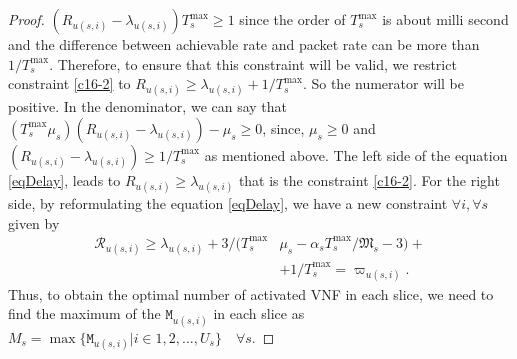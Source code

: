 \documentclass[lettersize,journal]{IEEEtran}
\begin{document}
\begin{proof}
$(R_{u(s,i)}-\lambda_{u(s,i)})T^{\max}_s \geq 1$ since the order of $T^{\max}_s$ is about milli second and the difference between achievable rate and packet rate can be more than $1/T^{\max}_s$.
Therefore, to ensure that this constraint will be valid, we restrict constraint \eqref{c16-2} to $R_{u(s,i)} \geq \lambda_{u(s,i)} + 1/T^{\max}_s$.
So the numerator will be positive.
In the denominator, we can say that $(T^{\max}_s\mu_s)(R_{u(s,i)}-\lambda_{u(s,i)}) - \mu_s \geq 0 $, since,
$\mu_s \geq 0$ and
$(R_{u(s,i)}-\lambda_{u(s,i)}) \geq 1/T^{\max}_s$ as mentioned above.
The left side of the equation \eqref{eqDelay}, leads to $R_{u(s,i)} \geq \lambda_{u(s,i)}$ that is the constraint \eqref{c16-2}.
For the right side, by reformulating the equation \eqref{eqDelay}, we have a new constraint $\forall i, \forall s$ given by
\begin{align}\label{RM}
\mathcal{R}_{u(s,i)} \geq \lambda_{u(s,i)}+ 3/(T^{\max}_s&\mu_s-\alpha_s T^{\max}_s/\mathfrak{M}_s-3)+\nonumber\\
&+ 1/T^{\max}_s=\varpi_{u(s,i)}.
\end{align}
Thus, to obtain the optimal number of activated VNF in each slice, we need to find the maximum of the
$\mathtt{M}_{u(s,i)}$ in each slice as $M_s = \max\{\mathtt{M}_{u(s,i)} | i \in 1,2,..., U_s\} \quad \forall s $.
\vspace{-3mm}
\end{proof}
\end{document}
